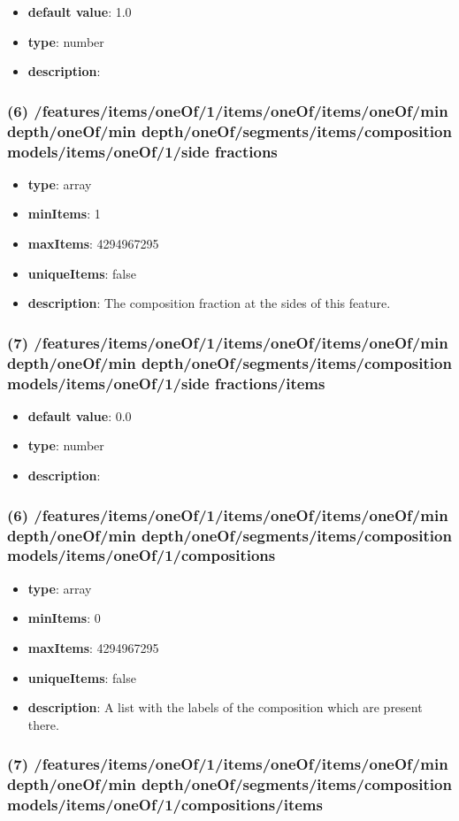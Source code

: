 \begin{itemize}[leftmargin=7em]\item {\bf default value}: 1.0
\item {\bf type}: number
\item {\bf description}: 
\end{itemize}\subsubsection{(6) /features/items/oneOf/1/items/oneOf/items/oneOf/min depth/oneOf/min depth/oneOf/segments/items/composition models/items/oneOf/1/side fractions}
\begin{itemize}[leftmargin=6em]\item {\bf type}: array
\item {\bf minItems}: 1
\item {\bf maxItems}: 4294967295
\item {\bf uniqueItems}: false
\item {\bf description}: The composition fraction at the sides of this feature.
\end{itemize}\subsubsection{(7) /features/items/oneOf/1/items/oneOf/items/oneOf/min depth/oneOf/min depth/oneOf/segments/items/composition models/items/oneOf/1/side fractions/items}
\begin{itemize}[leftmargin=7em]\item {\bf default value}: 0.0
\item {\bf type}: number
\item {\bf description}: 
\end{itemize}\subsubsection{(6) /features/items/oneOf/1/items/oneOf/items/oneOf/min depth/oneOf/min depth/oneOf/segments/items/composition models/items/oneOf/1/compositions}
\begin{itemize}[leftmargin=6em]\item {\bf type}: array
\item {\bf minItems}: 0
\item {\bf maxItems}: 4294967295
\item {\bf uniqueItems}: false
\item {\bf description}: A list with the labels of the composition which are present there.
\end{itemize}\subsubsection{(7) /features/items/oneOf/1/items/oneOf/items/oneOf/min depth/oneOf/min depth/oneOf/segments/items/composition models/items/oneOf/1/compositions/items}
